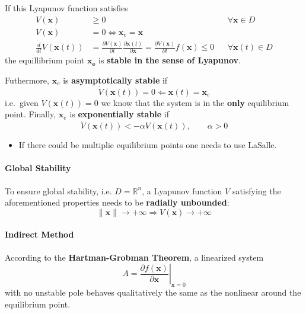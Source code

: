 If this Lyapunov function satisfies
\noindent\begin{align*}
    V(\mathbf{x})                 & \geq 0                                                                                                                                                          &  & \forall \mathbf{x}\in D    \\
    V(\mathbf{x})                 & = 0 \Leftrightarrow \mathbf{x}_e = \mathbf{x}                                                                                                                                                   \\
    \frac{d}{dt} V(\mathbf{x}(t)) & = \frac{\partial V(\mathbf{x})}{\partial t} \frac{\partial \mathbf{x}(t)}{\partial \mathbf{x}} = \frac{\partial V(\mathbf{x})}{\partial t} f(\mathbf{x}) \leq 0 &  & \forall \mathbf{x}(t)\in D
\end{align*}
the equillibrium point $\mathbf{x_e}$ is \textbf{stable in the sense of Lyapunov}.

\newpar{}
Futhermore, $\mathbf{x}_e$ is \textbf{asymptotically stable} if
\noindent\begin{equation*}
    \dot{V}(\mathbf{x}(t)) = 0 \Leftarrow \mathbf{x}(t) = \mathbf{x}_e
\end{equation*}
i.e.\ given $\dot{V}(\mathbf{x}(t)) = 0$ we know that the system is in the \textbf{only} equilibrium point. Finally, $\mathbf{x}_e$ is \textbf{exponentially stable} if
\noindent\begin{equation*}
    \dot{V}(\mathbf{x}(t)) < -\alpha V(\mathbf{x}(t)), \qquad \alpha>0
\end{equation*}

\newpar
{}
\begin{itemize}
    \item If there could be multiplie equilibrium points one needs to use LaSalle.
\end{itemize}

\paragraph{Global Stability}
To ensure global stability, i.e. $D=\mathbb{R}^n$, a Lyapunov function $V$ satisfying the aforementioned properties needs to be \textbf{radially unbounded}:
\noindent\begin{equation*}
    \|\mathbf{x}\| \to +\infty \Rightarrow V(\mathbf{x}) \to +\infty
\end{equation*}

\paragraph{Indirect Method}
According to the \textbf{Hartman-Grobman Theorem}, a linearized system
\noindent\begin{equation*}
    A = \left.\frac{\partial f(\mathbf{x})}{\partial \mathbf{x}} \right|_{\mathbf{x} = 0}
\end{equation*} with no unstable pole behaves qualitatively the same as the nonlinear around the equilibrium point.

